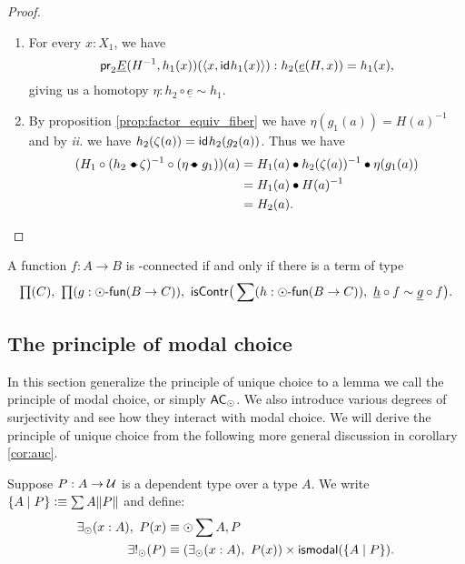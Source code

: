 \begin{proof}
\begin{enumerate}
\item For every $x:X_1$, we have
\begin{equation*}
\mathsf{pr}_{2}\underline{E}(H^{-1},h_1(x))({\langle x,\mathsf{id}_{}{h_1(x)}\rangle}):h_2(\underline{e}(H,x))= h_1(x),
\end{equation*}
giving us a homotopy $\eta:h_2\circ \underline{e}\sim h_1$.
\item By proposition \ref{prop:factor_equiv_fiber} we have $\eta(g_1(a))=H(a)^{-1}$ and by {\it ii.} we have
$h_2(\zeta(a))=\mathsf{id}_{}{h_2(g_2(a))}$. Thus we have
\begin{align*}
(H_1 \circ(h_2\leftwhisker\zeta)^{-1}\circ(\eta\rightwhisker g_1))(a) & = H_1(a)\bullet h_2(\zeta(a))^{-1}\bullet \eta(g_1(a))\\
& = H_1(a)\bullet H(a)^{-1}\\
& = H_2(a).
\end{align*}
\end{enumerate}
\end{proof}

\begin{cor}
A function $f:A\to B$ is \modal-connected if and only if there is a term of type
\begin{equation*}
\prd C\prd{g:\modalfunc(B\to C)} \mathsf{isContr}\big(\sum(h:\modalfunc(B\to C)),\ \underline{h}\circ
f\sim\underline{g}\circ f\big).
\end{equation*}
\end{cor}

\subsection{The principle of modal choice}\label{sec:ac_truncated}

In this section generalize the principle of unique choice to a lemma we call the principle of modal
choice, or simply $\mathsf{AC}_{\odot}$. We also introduce various degrees of surjectivity and see how they interact with modal choice.
We will derive
the principle of unique choice from the following more general discussion in corollary \ref{cor:auc}.

\begin{defn}
Suppose $P:A\to\mathcal{U}$ is a dependent type over a type $A$. We write $\{A\mid P\}\vcentcolon\equiv\sum A\|P\|$ and define:
\begin{align*}
\existsmodal(x:A),\ P(x) & \equiv \modal\sum A,P\\
\existsmodalunique(P) & \equiv  (\existsmodal(x:A),\ P(x))\times\ismodal(\{A\mid P\}).
\end{align*}
\end{defn}

